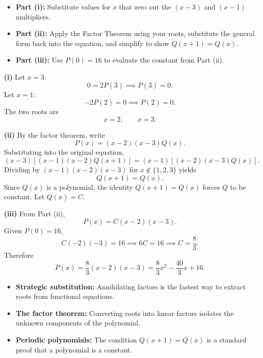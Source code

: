 \begin{hintbox}
\begin{itemize}[leftmargin=*]
\item \textbf{Part (i):} Substitute values for $x$ that zero out the $(x-3)$ and $(x-1)$ multipliers.
\item \textbf{Part (ii):} Apply the Factor Theorem using your roots, substitute the general form back into the equation, and simplify to show $Q(x+1)=Q(x)$.
\item \textbf{Part (iii):} Use $P(0)=16$ to evaluate the constant from Part (ii).
\end{itemize}
\end{hintbox}

\begin{solution}
\textbf{(i)} Let $x=3$:
\[
0=2P(3) \implies P(3)=0.
\]
Let $x=1$:
\[
-2P(2)=0 \implies P(2)=0.
\]
The two roots are
\[
\boxed{x=2,\qquad x=3.}
\]

\textbf{(ii)} By the factor theorem, write
\[
P(x)=(x-2)(x-3)Q(x).
\]
Substituting into the original equation,
\[
(x-3)[(x-1)(x-2)Q(x+1)]=(x-1)[(x-2)(x-3)Q(x)].
\]
Dividing by $(x-1)(x-2)(x-3)$ for $x\notin\{1,2,3\}$ yields
\[
Q(x+1)=Q(x).
\]
Since $Q(x)$ is a polynomial, the identity $Q(x+1)=Q(x)$ forces $Q$ to be constant. Let $Q(x)=C$.

\textbf{(iii)} From Part (ii),
\[
P(x)=C(x-2)(x-3).
\]
Given $P(0)=16$,
\[
C(-2)(-3)=16 \implies 6C=16 \implies C=\frac{8}{3}.
\]
Therefore
\[
\boxed{P(x)=\frac{8}{3}(x-2)(x-3)=\frac{8}{3}x^2-\frac{40}{3}x+16.}
\]
\end{solution}

\begin{takeaways}
\begin{itemize}[leftmargin=*]
\item \textbf{Strategic substitution:} Annihilating factors is the fastest way to extract roots from functional equations.
\item \textbf{The factor theorem:} Converting roots into linear factors isolates the unknown components of the polynomial.
\item \textbf{Periodic polynomials:} The condition $Q(x+1)=Q(x)$ is a standard proof that a polynomial is a constant.
\end{itemize}
\end{takeaways}
